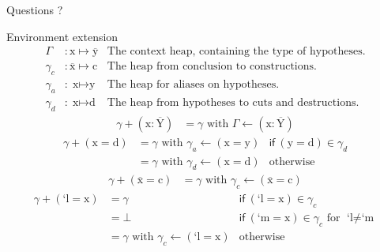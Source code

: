 \documentclass[xcolor=svgnames,11pt]{beamer}
\begin{document}
\begin{frame}[plain]
  \begin{center}
    \Huge Questions ?
  \end{center}
\end{frame}


\begin{frame}[plain]{Environment extension}
\small
\begin{align*}\ensuremath{\Gamma{{}}}&: \ensuremath{\text{x}\mapsto{}\overline{\text{y}}}&\ensuremath{\text{The context heap, containing the type of hypotheses.}}\\\ensuremath{\gamma_c{{}}}&: \ensuremath{\overline{\text{x}}\mapsto{}\text{c}}&\ensuremath{\text{The heap from conclusion to constructions.}}\\\ensuremath{\gamma_a{{}}}&: \ensuremath{\text{x}\mapsto{}\text{y}}&\ensuremath{\text{The heap for aliases on hypotheses.}}\\\ensuremath{\gamma_d{{}}}&: \ensuremath{\text{x}\mapsto{}\text{d}}&\ensuremath{\text{The heap from hypotheses to cuts and destructions.}}\end{align*}
\begin{align*}\ensuremath{\gamma{{}}+(\text{x}:\overline{\text{Y}})}&= \ensuremath{\gamma{{}}} \ensuremath{\text{ with }} \ensuremath{\Gamma{{}}\gets{}(\text{x}:\overline{\text{Y}})}\end{align*}
\begin{align*}\ensuremath{\gamma{{}}+(\text{x}=\text{d})}&= \ensuremath{\gamma{{}}} \ensuremath{\text{ with }} \ensuremath{\gamma_a{{}}\gets{}(\text{x}=\text{y})}&\ensuremath{\mathsf{if }\:(\text{y}=\text{d})\in{}\gamma_d{{}}}\\&= \ensuremath{\gamma{{}}} \ensuremath{\text{ with }} \ensuremath{\gamma_d{{}}\gets{}(\text{x}=\text{d})}&\ensuremath{\text{otherwise}}\end{align*}
\begin{align*}\ensuremath{\gamma{{}}} + \ensuremath{(\overline{\text{x}}=\text{c})}&= \ensuremath{\gamma{{}}} \ensuremath{\text{ with }} \ensuremath{\gamma_c{{}}\gets{}(\overline{\text{x}}=\text{c})}\end{align*}
\begin{align*}\ensuremath{\gamma{{}}} + \ensuremath{(\text{`l}=\text{x})}&= \ensuremath{\gamma{{}}}&\ensuremath{\mathsf{if }\:(\text{`l}=\text{x})\in{}\gamma_c{{}}}\\&= \ensuremath{\bot{{}}}&\ensuremath{\mathsf{if }\:(\text{`m}=\text{x})\in{}\gamma_c{{}}} \ensuremath{\text{ for }} \ensuremath{\text{`l}\neq{}\text{`m}}\\&= \ensuremath{\gamma{{}}} \ensuremath{\text{ with }} \ensuremath{\gamma_c{{}}\gets{}(\text{`l}=\text{x})}&\ensuremath{\text{otherwise}}\end{align*}

\end{frame}
\end{document}
